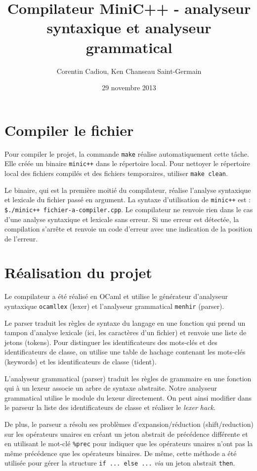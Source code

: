 \documentclass{article}
\title{Compilateur MiniC++ - analyseur syntaxique et analyseur grammatical}
\author{Corentin Cadiou, Ken Chanseau Saint-Germain}
\date{29 novembre 2013}
\begin{document}
\maketitle
\section*{Compiler le fichier}
Pour compiler le projet, la commande \texttt{make} réalise
automatiquement cette tâche. Elle créée un binaire \texttt{minic++}
dans le répertoire local. Pour nettoyer le répertoire local des
fichiers compilés et des fichiers temporaires, utiliser \texttt{make clean}.

Le binaire, qui est la première moitié du compilateur, réalise
l'analyse syntaxique et lexicale du fichier passé en argument. La
syntaxe d'utilisation de \texttt{minic++} est : \texttt{\$./minic++
  fichier-a-compiler.cpp}. Le compilateur ne renvoie rien dans le cas
d'une analyse syntaxique et lexicale sans erreur. Si une erreur est
détectée, la compilation s'arrête et renvoie un code d'erreur avec une
indication de la position de l'erreur.

\section*{Réalisation du projet}
Le compilateur a été réalisé en OCaml et utilise le générateur
d'analyseur syntaxique \texttt{ocamllex} (lexer) et l'analyseur grammatical
\texttt{menhir} (parser).

Le parser traduit les règles de syntaxe du langage en une fonction
qui prend un tampon d'analyse lexicale (ici, les caractères d'un
fichier) et renvoie une liste de jetons (tokens). Pour distinguer les
identificateurs des mots-clés et des identificateurs de classe, on
utilise une table de hachage contenant les mots-clés (keywords) et les
identificateurs de classe (tident).

L'analyseur grammatical (parser) traduit les règles de grammaire en
une fonction qui à un lexeur associe un arbre de syntaxe
abstraite. Notre analyseur grammatical utilise le module du lexeur
directement. On peut ainsi modifier dans le parseur la liste
des identificateurs de classe et réaliser le \emph{lexer hack}.

De plus, le parseur a résolu ses problèmes d'expansion/réduction
(shift/reduction) sur les opérateurs unaires en créant un jeton
abstrait de précédence différente et en utilisant le mot-clé
\texttt{\%prec} pour indiquer que les opérateurs unaires n'ont pas la
même précédence que les opérateurs binaires. De même, cette méthode a
été utilisée pour gérer la structure \texttt{if ... else ...}
\emph{via} un jeton abstrait \texttt{then}.
\pagebreak
\end{document}
